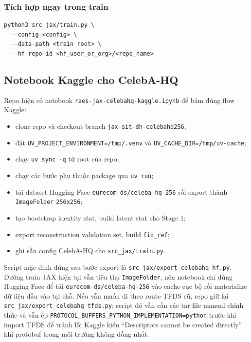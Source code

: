 \subsubsection{Tích hợp ngay trong train}

\begin{lstlisting}[style=rae]
python3 src_jax/train.py \
  --config <config> \
  --data-path <train_root> \
  --hf-repo-id <hf_user_or_org>/<repo_name>
\end{lstlisting}

\subsection{Notebook Kaggle cho CelebA-HQ}

Repo hiện có notebook \texttt{raes-jax-celebahq-kaggle.ipynb} để bám đúng flow
Kaggle:

\begin{itemize}[leftmargin=1.5em]
  \item clone repo và checkout branch \texttt{jax-sit-dh-celebahq256};
  \item đặt \texttt{UV\_PROJECT\_ENVIRONMENT=/tmp/.venv} và \texttt{UV\_CACHE\_DIR=/tmp/uv-cache};
  \item chạy \texttt{uv sync -q} từ root của repo;
  \item chạy các bước phụ thuộc package qua \texttt{uv run};
  \item tải dataset Hugging Face \texttt{eurecom-ds/celeba-hq-256} rồi export thành \texttt{ImageFolder} \texttt{256x256};
  \item tạo bootstrap identity stat, build latent stat cho Stage 1;
  \item export reconstruction validation set, build \texttt{fid\_ref};
  \item ghi sẵn config CelebA-HQ cho \texttt{src\_jax/train.py}.
\end{itemize}

Script mặc định đứng sau bước export là \texttt{src\_jax/export\_celebahq\_hf.py}.
Đường train JAX hiện tại vẫn tiêu thụ \texttt{ImageFolder}, nên notebook chỉ
dùng Hugging Face để tải \texttt{eurecom-ds/celeba-hq-256} vào cache cục bộ rồi
materialize dữ liệu đầu vào tại chỗ. Nếu vẫn muốn đi theo route TFDS cũ, repo
giữ lại \texttt{src\_jax/export\_celebahq\_tfds.py}; script đó vẫn cần các tar
file manual chính thức và vẫn ép
\texttt{PROTOCOL\_BUFFERS\_PYTHON\_IMPLEMENTATION=python} trước khi import TFDS
để tránh lỗi Kaggle kiểu ``Descriptors cannot be created directly'' khi
protobuf trong môi trường không đồng nhất.

